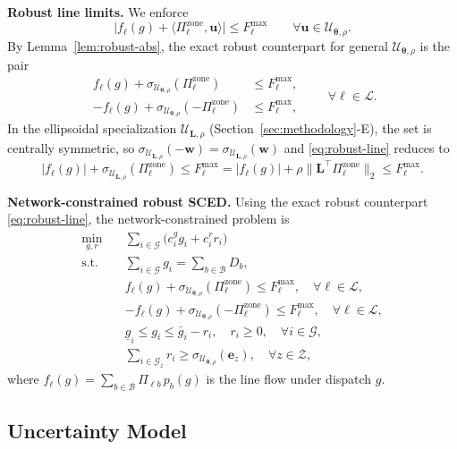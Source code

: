 \documentclass[lettersize,journal]{IEEEtran}
\newcommand{\cU}{\mathcal{U}}
\newcommand{\cG}{\mathcal{G}}
\newcommand{\cL}{\mathcal{L}}
\newcommand{\cB}{\mathcal{B}}
\newcommand{\cZ}{\mathcal{Z}}
\newcommand{\ip}[2]{\langle #1, #2 \rangle}
\newcommand{\norm}[1]{\|#1\|}
\newcommand{\btheta}{\bm{\theta}}
\newcommand{\bu}{\bm{u}}
\newcommand{\bw}{\bm{w}}
\newcommand{\bL}{\bm{L}}
\theoremstyle{definition}
\begin{document}
\textbf{Robust line limits.}
We enforce
\[
\big| f_\ell(g) + \ip{\Pi_\ell^{\text{zone}}}{\bu} \big|\le F_\ell^{\max}\qquad \forall \bu\in\cU_{\btheta,\rho}.
\]
By Lemma~\ref{lem:robust-abs}, the exact robust counterpart for general $\cU_{\btheta,\rho}$ is the pair
\begin{equation}\label{eq:robust-line}
\begin{aligned}
f_\ell(g) + \sigma_{\cU_{\btheta,\rho}}(\Pi_\ell^{\text{zone}}) &\le F_\ell^{\max},\\
-f_\ell(g) + \sigma_{\cU_{\btheta,\rho}}(-\Pi_\ell^{\text{zone}}) &\le F_\ell^{\max},
\end{aligned}
\qquad \forall \ell\in\cL.
\end{equation}
In the ellipsoidal specialization $\cU_{\bL,\rho}$ (Section~\ref{sec:methodology}-E), the set is centrally symmetric, so
$\sigma_{\cU_{\bL,\rho}}(-\bw)=\sigma_{\cU_{\bL,\rho}}(\bw)$ and \eqref{eq:robust-line} reduces to
\[
|f_\ell(g)| + \sigma_{\cU_{\bL,\rho}}(\Pi_\ell^{\text{zone}})\le F_\ell^{\max}
= |f_\ell(g)| + \rho \norm{\bL^\top \Pi_\ell^{\text{zone}}}_2 \le F_\ell^{\max}.
\]

\textbf{Network-constrained robust SCED.}
Using the exact robust counterpart \eqref{eq:robust-line}, the network-constrained problem is
\begin{equation}\label{eq:network-sced}
\begin{aligned}
\min_{g,r}\quad & \sum_{i \in \cG}\big(c_i^g g_i + c_i^r r_i\big) \\
\text{s.t.}\quad
& \sum_{i\in\cG} g_i = \sum_{b\in\cB} D_b, \\
& f_\ell(g) + \sigma_{\cU_{\btheta,\rho}}(\Pi_\ell^{\text{zone}}) \le F_\ell^{\max}, \quad \forall \ell\in\cL,\\
& -f_\ell(g) + \sigma_{\cU_{\btheta,\rho}}(-\Pi_\ell^{\text{zone}}) \le F_\ell^{\max}, \quad \forall \ell\in\cL,\\
& \underline g_i \le g_i \le \bar g_i - r_i,\quad r_i\ge 0,\quad \forall i\in\cG,\\
& \sum_{i \in \cG_z} r_i \ge \sigma_{\cU_{\btheta,\rho}}(\bm{e}_z), \quad \forall z\in\cZ,
\end{aligned}
\end{equation}
where $f_\ell(g) = \sum_{b\in\cB}\Pi_{\ell b}\,p_b(g)$ is the line flow under dispatch $g$.

\subsection{Uncertainty Model}
\end{document}
